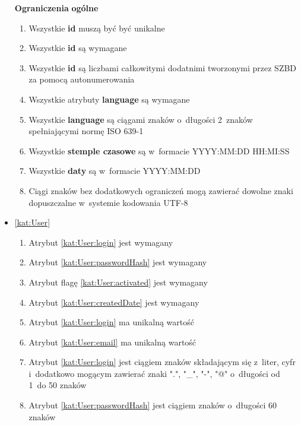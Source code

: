 \begin{itemize}[label={\textbf{Ograniczenia dla}}, wide, labelwidth=!, labelindent=0pt]
    \setlength\itemsep{1em}
    \item[\textbf{Ograniczenia}] \textbf{ogólne}
    \begin{enumerate}[label={\textbf{OGR/\protect\threedigits{\arabic{enumi}}}}, wide, labelwidth=!, align=left, leftmargin=3cm]
        \item Wszystkie \textbf{id} muszą być być unikalne
        \item Wszystkie \textbf{id} są wymagane
        \item Wszystkie \textbf{id} są liczbami całkowitymi dodatnimi tworzonymi przez SZBD za pomocą autonumerowania
        \item Wszystkie atrybuty \textbf{language} są wymagane
        \item Wszystkie \textbf{language} są ciągami znaków o~długości 2~znaków spełniającymi normę ISO 639-1
        \item Wszystkie \textbf{stemple czasowe} są w~formacie YYYY:MM:DD HH:MI:SS
        \item Wszystkie \textbf{daty} są w~formacie YYYY:MM:DD
        \item Ciągi znaków bez dodatkowych ograniczeń mogą zawierać dowolne znaki dopuszczalne w~systemie kodowania UTF-8
    \end{enumerate}
    \item\ref{kat:User}
    \begin{enumerate}[label={\textbf{OGR/\protect\threedigits{\arabic{enumi}}}}, wide, labelwidth=!, align=left, leftmargin=3cm, resume]
        \item Atrybut \ref{kat:User:login} jest wymagany
        \item Atrybut \ref{kat:User:passwordHash} jest wymagany
        \item Atrybut flagę \ref{kat:User:activated} jest wymagany
        \item Atrybut \ref{kat:User:createdDate} jest wymagany
        \item Atrybut \ref{kat:User:login} ma unikalną wartość
        \item Atrybut \ref{kat:User:email} ma unikalną wartość
        \item Atrybut \ref{kat:User:login} jest ciągiem znaków składającym się z~liter, cyfr i~dodatkowo mogącym zawierać znaki ".", "\_", "-", "@" o~długości od 1~do 50 znaków
        \item Atrybut \ref{kat:User:passwordHash} jest ciągiem znaków o~długości 60 znaków

\end{enumerate}
\end{itemize}
